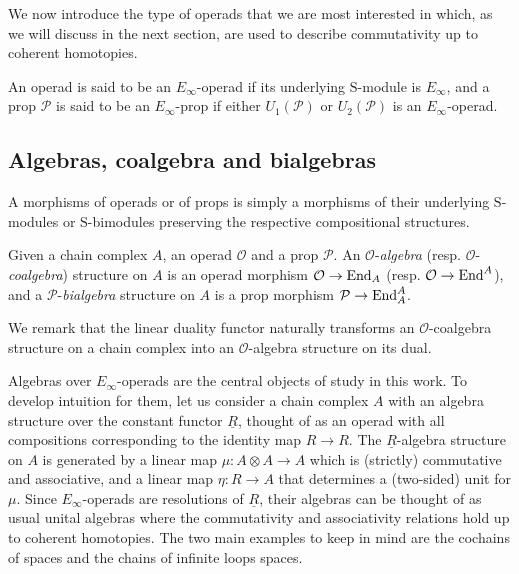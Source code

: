 We now introduce the type of operads that we are most interested in which, as we will discuss in the next section, are used to describe commutativity up to coherent homotopies.

\begin{definition}  \label{def: e-infinity operad and prop}
	An operad is said to be an $E_\infty$-operad if its underlying $\mathrm{S}$-module is $E_\infty$, and a prop $\mathcal P$ is said to be an $E_\infty$-prop if either $U_1(\mathcal P)$ or $U_2(\mathcal P)$ is an $E_\infty$-operad.
\end{definition}

\subsection{Algebras, coalgebra and bialgebras}

A morphisms of operads or of props is simply a morphisms of their underlying $\mathrm{S}$-modules or $\mathrm{S}$-bimodules preserving the respective compositional structures.

Given a chain complex $A$, an operad $\mathcal O$ and a prop $\mathcal P$.
An $\mathcal O$-\textit{algebra} (resp. $\mathcal O$-\textit{coalgebra}) structure on $A$ is an operad morphism $\mathcal O \to \mathrm{End}_A$ (resp. $\mathcal O \to \mathrm{End}^A$), and a $\mathcal P$-\textit{bialgebra} structure on $A$ is a prop morphism $\mathcal P \to \mathrm{End}_A^A$.

We remark that the linear duality functor naturally transforms an $\mathcal O$-coalgebra structure on a chain complex into an $\mathcal O$-algebra structure on its dual.

Algebras over $E_\infty$-operads are the central objects of study in this work.
To develop intuition for them, let us consider a chain complex $A$ with an algebra structure over the constant functor $\underline{R}$, thought of as an operad with all compositions corresponding to the identity map $R \to R$.
The $\underline{R}$-algebra structure on $A$ is generated by a linear map $\mu \colon A \otimes A \to A$ which is (strictly) commutative and associative, and a linear map $\eta \colon R \to A$ that determines a (two-sided) unit for $\mu$.
Since $E_\infty$-operads are resolutions of $\underline{R}$, their algebras can be thought of as usual unital algebras where the commutativity and associativity relations hold up to coherent homotopies.
The two main examples to keep in mind are the cochains of spaces and the chains of infinite loops spaces.
